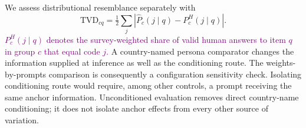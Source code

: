 We assess distributional resemblance separately with
\begin{equation}
\mathrm{TVD}_{cq}=\tfrac12\sum_j|\widehat P_c(j\mid q)-P_c^{H}(j\mid q)|.
\end{equation}
\textcolor{purple}{$P_c^{H}(j\mid q)$ denotes the survey-weighted share of valid human answers to item $q$ in group $c$ that equal code $j$.}
A country-named persona comparator changes the information supplied at inference as well as the conditioning route. The weights-by-prompts comparison is consequently a configuration sensitivity check. Isolating conditioning route would require, among other controls, a prompt receiving the same anchor information. Unconditioned evaluation removes direct country-name conditioning; it does not isolate anchor effects from every other source of variation.
